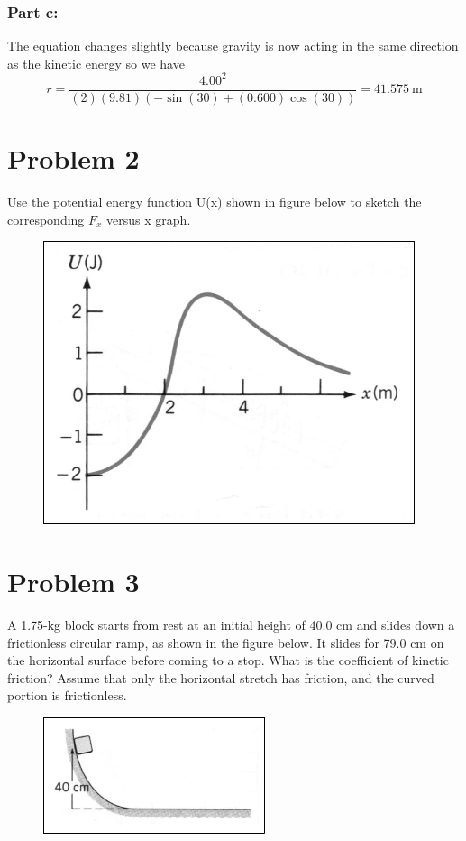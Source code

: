 \documentclass{article}
\begin{document}
\subsubsection*{Part c:}
 The equation changes slightly because gravity is now acting in the same direction as the kinetic energy so we have
\[
	r = \frac{4.00^2}{(2)(9.81)\left(-\sin(30) + (0.600)\cos(30)\right)} = \boxed{41.575\ \text{m}}
\]


\section*{Problem 2}
Use the potential energy function U(x) shown in figure below to sketch the corresponding $F_x$ versus x
graph.

\begin{figure}[ht]
    \centering
    \includegraphics[scale=.5]{drawing-1.png}
\end{figure}

\section*{Problem 3}
A 1.75-kg block starts from rest at an initial height of 40.0 cm and slides down a frictionless circular ramp,
as shown in the figure below. It slides for 79.0 cm on the horizontal surface before coming to a stop. What is
the coefficient of kinetic friction? Assume that only the horizontal stretch has friction, and the curved portion
is frictionless.

\begin{figure}[ht]
    \centering
    \includegraphics[scale=.5]{drawing-2.png}
\end{figure}
\end{document}
